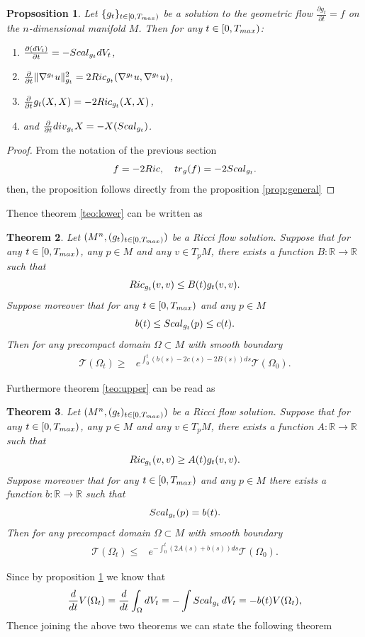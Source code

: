 \documentclass{amsart}
\newtheorem{theorem}{Theorem}[section]
\newtheorem{proposition}[theorem]{Propsosition}
\theoremstyle{definition}
\theoremstyle{remark}
\newcommand{\tr}{{\rm tr}}
\newcommand{\V}{{\rm V}}
\begin{document}
 \begin{proposition}\label{prop:rf}
    Let $\{g_t\}_{t\in [0,T_{\rm max})}$ be a solution to the geometric flow $\frac{\partial g_t}{\partial t}=f$ on the $n$-dimensional manifold $M$.  Then for any $t\in [0,T_{\rm max})$:
    \begin{enumerate}
        \item $ \frac{\partial (d\V_{t})}{ \partial t }=
        -{\rm Scal}_{g_t}d\V_{t}$,
        \item $
\frac{\partial}{\partial t}\Vert \nabla^{g_t}u\Vert^2_{g_t}=2{\rm Ric}_{g_t}(\nabla^{g_t}u,\nabla^{g_t} u)$, 
\item $
\frac{\partial}{\partial t}g_t(X,X)=-2{\rm Ric}_{g_t}(X,X)$,  
\item and $  \frac{\partial}{\partial t} {\rm div}_{g_t}X=-X({\rm Scal}_{g_t})$.
\end{enumerate}
\end{proposition}
\begin{proof}From the notation of the previous section 
 $$
 f=-2{\rm Ric},\quad \tr_g(f)=-2{\rm Scal}_{g_t}.
 $$
 then, the proposition follows directly from the proposition \ref{prop:general}
\end{proof}
 Thence theorem \ref{teo:lower} can be written as
 \begin{theorem}
Let $(M^n,(g_t)_{t\in [0,T_{\rm max})})$ be a Ricci flow solution. Suppose that for any $t\in [0,T_{\rm max})$, any $p\in M$ and any $v\in T_pM$, there exists a function $B:\mathbb{R}\to\mathbb{R}$ such that 
$$
{\rm Ric}_{g_t}(v,v)\leq B(t)g_t(v,v). 
$$
Suppose moreover that for any $t\in [0,T_{\rm max})$ and any $p\in M$
$$
b(t)\leq {\rm Scal}_{g_t}(p)\leq c(t).
$$
Then for any precompact domain $\Omega\subset M$ with smooth boundary 
$$
\begin{aligned}
\mathcal{T}(\Omega_t)\geq& e^{\int_0^t\left(b(s)-2c(s)-2B(s)\right)ds}\mathcal{T}(\Omega_0). 
\end{aligned}
$$
 \end{theorem}

Furthermore theorem \ref{teo:upper} can be read as
\begin{theorem}Let $(M^n,(g_t)_{t\in [0,T_{\rm max})})$ be a Ricci flow solution. Suppose that for any $t\in [0,T_{\rm max})$, any $p\in M$ and any $v\in T_pM$, there exists a function $A:\mathbb{R}\to\mathbb{R}$ such that 
$$
{\rm Ric}_{g_t}(v,v)\geq A(t)g_t(v,v). 
$$
Suppose moreover that for any $t\in [0,T_{\rm max})$ and any $p\in M$ there exists a function $b:\mathbb{R}\to\mathbb{R}$ such that
$$
 {\rm Scal}_{g_t}(p)=b(t).
$$
Then for any precompact domain $\Omega\subset M$ with smooth boundary 
$$
\begin{aligned}
 \mathcal{T}(\Omega_t)\leq& e^{-\int_0^t\left(2A(s)+b(s)\right)ds}\mathcal{T}(\Omega_0). 
\end{aligned}
$$  
\end{theorem}
Since  by proposition \ref{prop:rf} we know that
$$
\frac{d}{dt}\V(\Omega_t)=\frac{d}{dt}\int_\Omega d\V_t=-\int {\rm Scal}_{g_t}\, d\V_t=-b(t)\V(\Omega_t),
$$
Thence joining the above two theorems we can state the following theorem
\end{document}
